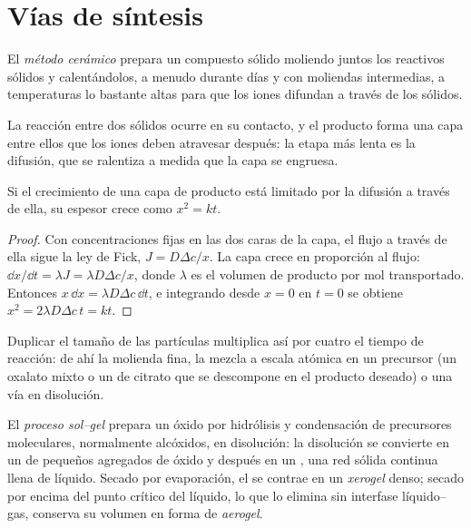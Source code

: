\section{Vías de síntesis}

\begin{definition}\label{def:b3:inorganic-materials:ceramic-method}
El \emph{método cerámico} prepara un compuesto sólido
moliendo juntos los reactivos sólidos y calentándolos, a menudo durante días y
con moliendas intermedias, a temperaturas lo bastante altas para que los iones difundan a través de los
sólidos.
\end{definition}

La reacción entre dos sólidos ocurre en su contacto, y el producto forma una
capa entre ellos que los iones deben atravesar después: la etapa más lenta
es la difusión, que se ralentiza a medida que la capa se engruesa.

\begin{proposition}\label{prop:b3:inorganic-materials:parabolic}
Si el crecimiento de una capa de producto está limitado por la difusión a través de ella, su
espesor crece como $x^2 = kt$.
\end{proposition}

\begin{proof}
Con concentraciones fijas en las dos caras de la capa, el flujo a través de ella
sigue la ley de Fick, $J = D\Delta c/x$. La capa crece en proporción al flujo:
$\dd x/\dd t = \lambda J = \lambda D\Delta c/x$, donde $\lambda$ es el volumen de producto por mol transportado. Entonces
$x\,\dd x = \lambda D\Delta c\,\dd t$, e integrando desde $x = 0$ en $t = 0$ se obtiene $x^2 = 2\lambda D\Delta c\,t = kt$.
\end{proof}

Duplicar el tamaño de las partículas multiplica así por cuatro el tiempo de reacción: de ahí
la molienda fina, la mezcla a escala atómica en un precursor (un oxalato mixto o un 
de citrato que se descompone en el producto deseado) o una vía en disolución.

\begin{definition}\label{def:b3:inorganic-materials:sol-gel}
El \emph{proceso sol--gel} prepara un óxido por
hidrólisis y condensación de precursores moleculares, normalmente alcóxidos, en
disolución: la disolución se convierte en un  de pequeños agregados de óxido y después en un , una
red sólida continua llena de líquido. Secado por evaporación, el 
se contrae en un \emph{xerogel} denso; secado por encima del punto
crítico del líquido, lo que lo elimina sin interfase líquido--gas, conserva
su volumen en forma de \emph{aerogel}.
\end{definition}

